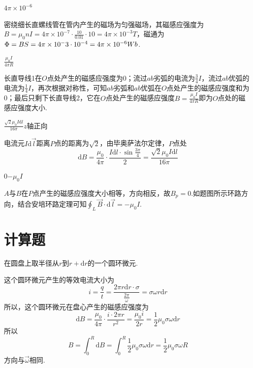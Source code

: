 \documentclass[b5paper,opensource,sourcefont,parskip]{qyxf-book}
\newcommand{\di}[1]{\mathrm{d}#1}
\begin{document}
 $4\pi\times10^{-6}$


\solve
密绕细长直螺线管在管内产生的磁场为匀强磁场，其磁感应强度为$B=\mu_0nI=4\pi\times10^{-7}\cdot\frac{10}{0.01}\cdot10=4\pi\times10^{-3}T$，磁通为$\Phi=BS=4\pi\times10^-3\cdot10\time10^{-4}=4\pi\times10^{-6}Wb$.

 $\frac{\mu_0I}{4\pi R}$

\solve
长直导线1在$O$点处产生的磁感应强度为$0$；流过$ab$劣弧的电流为$\frac{3}{4}I$，流过$ab$优弧的电流为$\frac{1}{4}I$，再次根据对称性，可知$ab$劣弧和$ab$优弧在$O$点处产生的磁感应强度和为0；最后只剩下长直导线2，它在$O$点处产生的磁感应强度$B=\frac{\mu_0I}{4\pi R}$即为$O$点处的磁感应强度大小.

 $\frac{\sqrt{2}\mu_0I\di l}{16\pi}$\quad $z$轴正向

\solve
电流元$I\di\vec{l}$距离$P$点的距离为$\sqrt{2}$，由毕奥萨法尔定律，$P$点处
\begin{equation*}
\di B=\frac{\mu_0}{4\pi}\cdot\frac{I\di l\cdot\sin\frac{3\pi}{4}}{2}=\frac{\sqrt{2}\mu_0I\di l}{16\pi}
\end{equation*}

 0\quad$-\mu_0 I$

\analysis
$A$与$B$在$P$点产生的磁感应强度大小相等，方向相反，故$B_p=0$.如题图所示环路方向，结合安培环路定理可知$\oint_L\vec{B}\cdot\di\vec{l}=-\mu_0 I$.

\section{计算题}

\solve
在圆盘上取半径从$r$到$r+\di r$的一个圆环微元.

这个圆环微元产生的等效电流大小为
\begin{equation*}
i=\frac{q}{t}=\frac{2\pi r\di r\cdot\sigma}{\frac{2\pi}{\omega}}=\sigma\omega r\di r
\end{equation*}
所以，这个圆环微元在盘心产生的磁感应强度为
\begin{equation*}
\di B=\frac{\mu_0}{4\pi}\cdot\frac{i\cdot2\pi r}{r^2}=\frac{\mu_0i}{2r}=\frac{1}{2}\mu_0\sigma\omega\di r
\end{equation*}
所以
\begin{equation*}
B=\int_0^R\di B=\int_0^R\frac{1}{2}\mu_0\sigma\omega\di r=\frac{1}{2}\mu_0\sigma\omega R
\end{equation*}
方向与$\vec{\omega}$相同.

\end{document}
